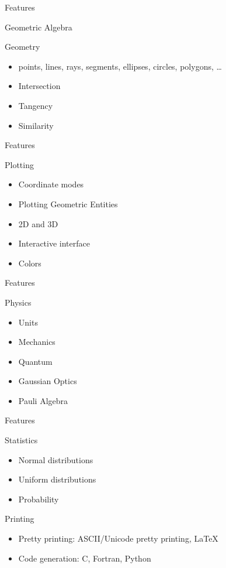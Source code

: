 \documentclass[xcolor=svgnames]{beamer}
\begin{document}
\begin{frame}{Features}
\begin{block}{Geometric Algebra}
\end{block}

\begin{block}{Geometry}
\begin{itemize}
\item points, lines, rays, segments, ellipses, circles, polygons, \ldots
\item Intersection
\item Tangency
\item Similarity
\end{itemize}
\end{block}
\end{frame}

\begin{frame}{Features}
\begin{block}{Plotting}
\begin{itemize}
\item Coordinate modes
\item Plotting Geometric Entities
\item 2D and 3D
\item Interactive interface
\item Colors
\end{itemize}
\end{block}
\end{frame}

\begin{frame}{Features}
\begin{block}{Physics}
\begin{itemize}
\item Units
\item Mechanics
\item Quantum
\item Gaussian Optics
\item Pauli Algebra
\end{itemize}
\end{block}
\end{frame}

\begin{frame}{Features}
\begin{block}{Statistics}
\begin{itemize}
\item Normal distributions
\item Uniform distributions
\item Probability
\end{itemize}
\end{block}
\end{frame}

\begin{frame}
\begin{block}{Printing}
\begin{itemize}
\item Pretty printing: ASCII/Unicode pretty printing, LaTeX
\item Code generation: C, Fortran, Python
\end{itemize}
\end{block}
\end{frame}
\end{document}
